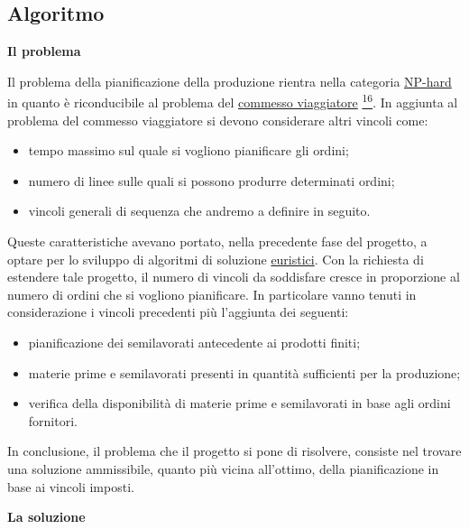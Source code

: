 \subsection{Algoritmo}

\textbf{Il problema}

Il problema della pianificazione della produzione rientra nella categoria \hyperref[Np-hard]{NP-hard\glo} in quanto è riconducibile al problema del 
\hyperref[Commesso viaggiatore]{commesso viaggiatore\glo} \hyperref[commesso]{\textsuperscript{16}}. 
In aggiunta al problema del commesso viaggiatore si devono considerare
altri vincoli come: 
\begin{itemize}
    \item tempo massimo sul quale si vogliono pianificare gli ordini;
    \item numero di linee sulle quali si possono produrre determinati ordini;
    \item vincoli generali di sequenza che andremo a definire in seguito.
\end{itemize}

Queste caratteristiche avevano portato, nella precedente fase del progetto, a optare per lo sviluppo di algoritmi di soluzione \hyperref[Euristica]{euristici\glo [16]}.
Con la richiesta di estendere tale progetto, il numero di vincoli da soddisfare cresce in proporzione al numero di ordini che si vogliono pianificare.
In particolare vanno tenuti in considerazione i vincoli precedenti più l'aggiunta dei seguenti:

\begin{itemize}
    \item pianificazione dei semilavorati antecedente ai prodotti finiti;
    \item materie prime e semilavorati presenti in quantità sufficienti per la produzione;
    \item verifica della disponibilità di materie prime e semilavorati in base agli ordini fornitori.
\end{itemize}

In conclusione, il problema che il progetto si pone di risolvere, consiste nel trovare una soluzione ammissibile, quanto più vicina all'ottimo,
della pianificazione
in base ai vincoli imposti.\newline

\textbf{La soluzione}


